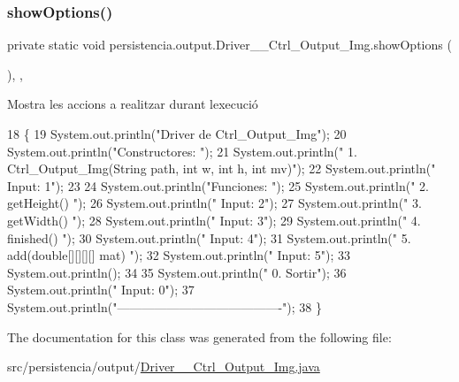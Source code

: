 \subsubsection{\texorpdfstring{show\+Options()}{showOptions()}}
{\footnotesize\ttfamily private static void persistencia.\+output.\+Driver\+\_\+\+\_\+\+Ctrl\+\_\+\+Output\+\_\+\+Img.\+show\+Options (\begin{DoxyParamCaption}{ }\end{DoxyParamCaption})\hspace{0.3cm}{\ttfamily [inline]}, {\ttfamily [static]}, {\ttfamily [private]}}



Mostra les accions a realitzar durant l\textquotesingle{}execució 


\begin{DoxyCode}
18                                      \{
19         System.out.println(\textcolor{stringliteral}{"Driver de Ctrl\_Output\_Img"});
20         System.out.println(\textcolor{stringliteral}{"Constructores: "});
21         System.out.println(\textcolor{stringliteral}{"     1. Ctrl\_Output\_Img(String path, int w, int h, int mv)"});
22         System.out.println(\textcolor{stringliteral}{"     Input: 1"});
23 
24         System.out.println(\textcolor{stringliteral}{"Funciones: "});
25         System.out.println(\textcolor{stringliteral}{"     2. getHeight() "});
26         System.out.println(\textcolor{stringliteral}{"     Input: 2"});
27         System.out.println(\textcolor{stringliteral}{"     3. getWidth() "});
28         System.out.println(\textcolor{stringliteral}{"     Input: 3"});
29         System.out.println(\textcolor{stringliteral}{"     4. finished() "});
30         System.out.println(\textcolor{stringliteral}{"     Input: 4"});
31         System.out.println(\textcolor{stringliteral}{"     5. add(double[][][][] mat) "});
32         System.out.println(\textcolor{stringliteral}{"     Input: 5"});
33         System.out.println();
34 
35         System.out.println(\textcolor{stringliteral}{"     0. Sortir"});
36         System.out.println(\textcolor{stringliteral}{"     Input: 0"});
37         System.out.println(\textcolor{stringliteral}{"----------------------------------------"});
38     \}
\end{DoxyCode}


The documentation for this class was generated from the following file\+:\begin{DoxyCompactItemize}
\item 
src/persistencia/output/\hyperlink{Driver____Ctrl__Output__Img_8java}{Driver\+\_\+\+\_\+\+Ctrl\+\_\+\+Output\+\_\+\+Img.\+java}\end{DoxyCompactItemize}
